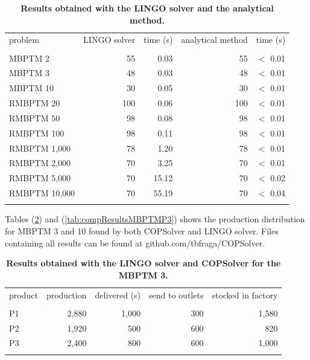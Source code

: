 \documentclass[10pt,fleqn,a4paper,twoside]{article}
\begin{document}
\begin{table}[ht]
\begin{center}
\caption{\textbf{Results obtained with the LINGO solver and the analytical method.}}
\begin{footnotesize}
\begin{tabular}[c]{l r r r r}
\\
problem & LINGO solver & time (s) & analytical method & time (s) \\
\cline {1-5} \\
MBPTM 2 & 55 & 0.03 & 55 & $<$ 0.01 \\
MBPTM 3 & 48 & 0.03 & 48 & $<$ 0.01 \\
MBPTM 10 & 30 & 0.05 & 30 & $<$ 0.01 \\
RMBPTM 20 & 100 & 0.06 & 100 & $<$ 0.01 \\
RMBPTM 50 & 98 & 0.08 & 98 & $<$ 0.01 \\
RMBPTM 100 & 98 & 0.11 & 98 & $<$ 0.01 \\
RMBPTM 1,000 & 78 & 1.20 & 78 & $<$ 0.01 \\
RMBPTM 2,000 & 70 & 3.25 & 70 & $<$ 0.01 \\
RMBPTM 5,000 & 70 & 15.12 & 70 & $<$ 0.02 \\
RMBPTM 10,000 & 70 & 55.19 & 70 & $<$ 0.04 \\
\cline {1-5} \\
\end{tabular}
\label{tab:results}
\end{footnotesize}
\end{center}
\end{table}

Tables (\ref{tab:compResultsMBPTMP2}) and (\ref{tab:compResultsMBPTMP3}) shows the production distribution for MBPTM 3 and 10 found by both COPSolver and LINGO solver. Files containing all results can be found at github.com/tbfraga/COPSolver.

\begin{table}[ht]
\begin{center}
\caption{\textbf{Results obtained with the LINGO solver and COPSolver for the MBPTM 3.}}
\begin{footnotesize}
\begin{tabular}[c]{l r r r r}
\\
product & production & delivered (s) & send to outlets & stocked in factory \\
\cline {1-5} \\
P1 & 2,880 & 1,000 & 300 & 1,580 \\
P2 & 1,920 & 500 & 600 & 820 \\
P3 & 2,400 & 800 & 600 & 1,000 \\
\cline {1-5} \\
\end{tabular}
\label{tab:compResultsMBPTMP2}
\end{footnotesize}
\end{center}
\end{table}
\end{document}

